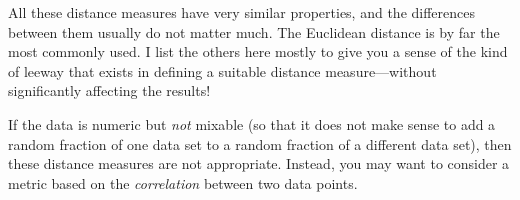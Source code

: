 
All these distance measures have very similar properties, and the
differences between them usually do not matter much. The Euclidean
distance is by far the most commonly used. I list the others here
mostly to give you a sense of the kind of leeway that exists in
defining a suitable distance measure---without significantly affecting
the results!

If the data is numeric but \emph{not} mixable (so that it does not
make sense to add a random fraction of one data set to a random
fraction of a different data set), then these distance measures are
not appropriate. Instead, you may want to consider a metric based on
the \emph{correlation}  between two data points.

